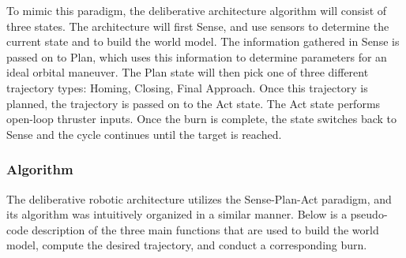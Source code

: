 \documentclass[journal, 10pt]{IEEEtran}
\begin{document}
To mimic this paradigm, the deliberative architecture algorithm will consist of three states. The architecture will first Sense, and use sensors to determine the current state and to build the world model. The information gathered in Sense is passed on to Plan, which uses this information to determine parameters for an ideal orbital maneuver. The Plan state will then pick one of three different trajectory types: Homing, Closing, Final Approach. Once this trajectory is planned, the trajectory is passed on to the Act state. The Act state performs open-loop thruster inputs. Once the burn is complete, the state switches back to Sense and the cycle continues until the target is reached.

\subsubsection{Algorithm}
The deliberative robotic architecture utilizes the Sense-Plan-Act paradigm, and its algorithm was intuitively organized in a similar manner. Below is a pseudo-code description of the three main functions that are used to build the world model, compute the desired trajectory, and conduct a corresponding burn.
\end{document}
